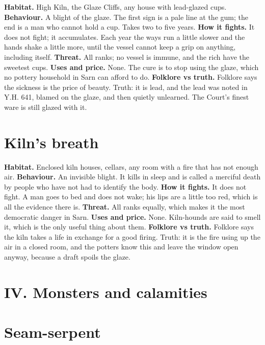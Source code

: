 \documentclass{design/chronicle}
\begin{document}
\textbf{Habitat.} High Kiln, the Glaze Cliffs, any house with lead-glazed cups. \textbf{Behaviour.} A blight of the glaze. The first sign is a pale line at the gum; the end is a man who cannot hold a cup. Takes two to five years. \textbf{How it fights.} It does not fight; it accumulates. Each year the ways run a little slower and the hands shake a little more, until the vessel cannot keep a grip on anything, including itself. \textbf{Threat.} All ranks; no vessel is immune, and the rich have the sweetest cups. \textbf{Uses and price.} None. The cure is to stop using the glaze, which no pottery household in Sarn can afford to do. \textbf{Folklore vs truth.} Folklore says the sickness is the price of beauty. Truth: it is lead, and the lead was noted in Y.H. 641, blamed on the glaze, and then quietly unlearned. The Court’s finest ware is still glazed with it.

\section*{Kiln’s breath}

\textbf{Habitat.} Enclosed kiln houses, cellars, any room with a fire that has not enough air. \textbf{Behaviour.} An invisible blight. It kills in sleep and is called a merciful death by people who have not had to identify the body. \textbf{How it fights.} It does not fight. A man goes to bed and does not wake; his lips are a little too red, which is all the evidence there is. \textbf{Threat.} All ranks equally, which makes it the most democratic danger in Sarn. \textbf{Uses and price.} None. Kiln-hounds are said to smell it, which is the only useful thing about them. \textbf{Folklore vs truth.} Folklore says the kiln takes a life in exchange for a good firing. Truth: it is the fire using up the air in a closed room, and the potters know this and leave the window open anyway, because a draft spoils the glaze.

\CRrule

\section*{IV. Monsters and calamities}

\section*{Seam-serpent}
\end{document}

